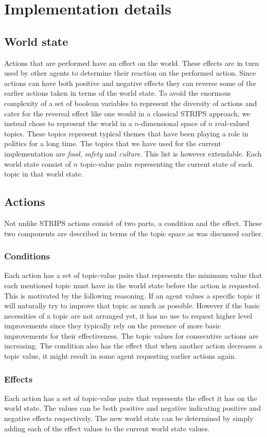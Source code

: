 \documentclass[11pt,a4paper]{article}
\begin{document}
\section{Implementation details}
  \subsection{World state}
    Actions that are performed have an effect on the world. These effects are in turn used by other agents to determine their reaction on the performed action. Since actions can have both positive and negative effects they can reverse some of the earlier actions taken in terms of the world state. To avoid the enormous complexity of a set of boolean variables to represent the diversity of actions and cater for the reversal effect like one would in a classical STRIPS approach, we instead chose to represent the world in a $n$-dimensional space of $n$ real-valued topics. These topics represent typical themes that have been playing a role in politics for a long time. The topics that we have used for the current implementation are \emph{food}, \emph{safety} and \emph{culture}. This list is however extendable. Each world state consist of $n$ topic-value pairs representing the current state of each topic in that world state.
  \subsection{Actions}
    Not unlike STRIPS actions consist of two parts, a condition and the effect. These two components are described in terms of the topic space as was discussed earlier.
    \subsubsection{Conditions}
      Each action has a set of topic-value pairs that represents the minimum value that each mentioned topic must have in the world state before the action is requested. This is motivated by the following reasoning. If an agent values a specific topic it will naturally try to improve that topic as much as possible. However if the basic necessities of a topic are not arranged yet, it has no use to request higher level improvements since they typically rely on the presence of more basic improvements for their effectiveness. The topic values for consecutive actions are increasing. The condition also has the effect that when another action decreases a topic value, it might result in some agent requesting earlier actions again.
    \subsubsection{Effects}
      Each action has a set of topic-value pairs that represents the effect it has on the world state. The values can be both positive and negative indicating positive and negative effects respectively. The new world state can be determined by simply adding each of the effect values to the current world state values.
\end{document}
